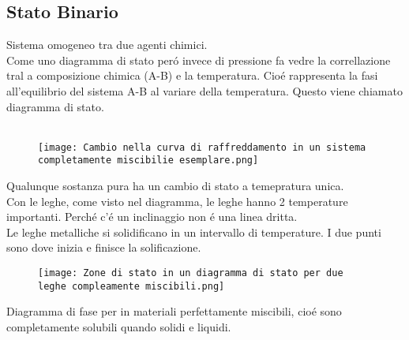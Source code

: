 \documentclass{article}
\begin{document}
{        \subsection{Stato Binario}
            Sistema omogeneo tra due agenti chimici.\\
            Come uno diagramma di stato per\'o invece di pressione fa vedre la correllazione tral a composizione chimica (A-B) e la temperatura. Cio\'e rappresenta la fasi all'equilibrio del sistema A-B al variare della temperatura. Questo viene chiamato diagramma di stato.\\ \\
           \begin{figure}[ht]
                \centering
                \texttt{[image: Cambio nella curva di raffreddamento in un sistema completamente miscibilie esemplare.png]}
            \end{figure}
            Qualunque sostanza pura ha un cambio di stato a temepratura unica.\\
            Con le leghe, come visto nel diagramma, le leghe hanno 2 temperature importanti. Perch\'e c'\'e un inclinaggio non \'e una linea dritta.\\
            Le leghe metalliche si solidificano in un intervallo di temperature. I due punti sono dove inizia e finisce la solificazione.
            \begin{figure}[!h]
                \centering
                \texttt{[image: Zone di stato in un diagramma di stato per due leghe compleamente miscibili.png]}
            \end{figure}
            Diagramma di fase per in materiali perfettamente miscibili, cio\'e sono completamente solubili quando solidi e liquidi.
}
\end{document}
